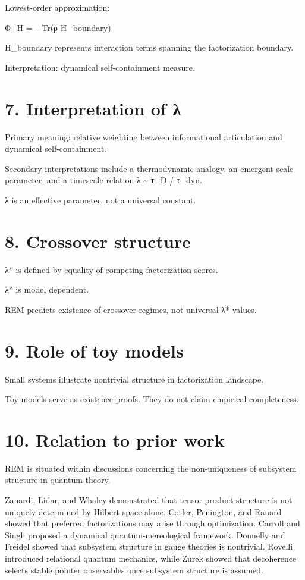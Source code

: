 \documentclass[]{article}
\begin{document}
Lowest-order approximation:

Φ\_H = −Tr(ρ H\_boundary)

H\_boundary represents interaction terms spanning the factorization boundary.

Interpretation: dynamical self-containment measure.

\section{7. Interpretation of λ}
Primary meaning: relative weighting between informational articulation and dynamical self-containment.

Secondary interpretations include a thermodynamic analogy, an emergent scale parameter, and a timescale relation λ \textasciitilde{} τ\_D / τ\_dyn.

λ is an effective parameter, not a universal constant.

\section{8. Crossover structure}
λ* is defined by equality of competing factorization scores.

λ* is model dependent.

REM predicts existence of crossover regimes, not universal λ* values.

\section{9. Role of toy models}
Small systems illustrate nontrivial structure in factorization landscape.

Toy models serve as existence proofs. They do not claim empirical completeness.

\section{10. Relation to prior work}
REM is situated within discussions concerning the non-uniqueness of subsystem structure in quantum theory.

Zanardi, Lidar, and Whaley demonstrated that tensor product structure is not uniquely determined by Hilbert space alone. Cotler, Penington, and Ranard showed that preferred factorizations may arise through optimization. Carroll and Singh proposed a dynamical quantum-mereological framework. Donnelly and Freidel showed that subsystem structure in gauge theories is nontrivial. Rovelli introduced relational quantum mechanics, while Zurek showed that decoherence selects stable pointer observables once subsystem structure is assumed.
\end{document}
